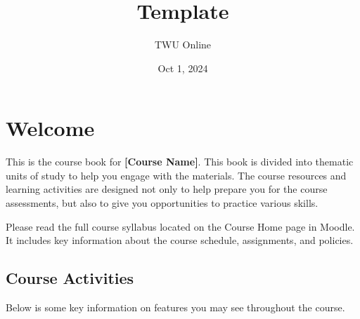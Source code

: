 \documentclass[
  letterpaper,
  DIV=11,
  numbers=noendperiod]{scrreprt}
\title{Template}
\author{TWU Online}
\date{Oct 1, 2024}
\renewcommand*\contentsname{Table of contents}
\newcommand\contentsname{Table of contents}
\begin{document}
\maketitle

\renewcommand*\contentsname{Table of contents}
{
\hypersetup{linkcolor=}
\setcounter{tocdepth}{2}
\tableofcontents
}


\chapter*{Welcome}\label{welcome}


This is the course book for \textbf{{[}Course Name{]}}. This book is
divided into thematic units of study to help you engage with the
materials. The course resources and learning activities are designed not
only to help prepare you for the course assessments, but also to give
you opportunities to practice various skills.

\begin{tcolorbox}[enhanced jigsaw, bottomrule=.15mm, colframe=quarto-callout-note-color-frame, arc=.35mm, rightrule=.15mm, opacityback=0, toprule=.15mm, breakable, leftrule=.75mm, left=2mm, colback=white]
\begin{minipage}[t]{5.5mm}
\textcolor{quarto-callout-note-color}{\faInfo}
\end{minipage}%
\begin{minipage}[t]{\textwidth - 5.5mm}

Please read the full course syllabus located on the Course Home page in
Moodle. It includes key information about the course schedule,
assignments, and policies.

\end{minipage}%
\end{tcolorbox}

\section*{Course Activities}\label{course-activities}


Below is some key information on features you may see throughout the
course.
\end{document}

